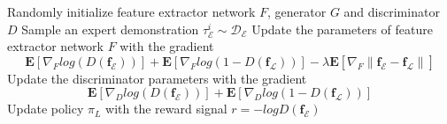 \begin{algorithm}
  \caption{\DAIL{}}
  \label{ch:DAIL:alg:ProposedModel}

  \begin{algorithmic}[1]
    \Input
    \EndInput

    \State Randomly initialize feature extractor network $F$, generator $G$ and discriminator $D$
    \State Sample an expert demonstration $\tau^i_\mathcal{E} \sim \mathcal{D}_\mathcal{E}$
    \State Update the parameters of feature extractor network $F$ with the gradient
    \[\mathbf{E}[
        \nabla_F log(D( \mathbf{f}_\mathcal{E} ))
      ] + \mathbf{E}[
        \nabla_F log(1 - D( \mathbf{f}_\mathcal{L} ))
      ] - \lambda \mathbf{E}[
        \nabla_F \left\|
        \mathbf{f}_\mathcal{E} - \mathbf{f}_\mathcal{L}
        \right\|
      ]
    \]
    \State Update the discriminator parameters with the gradient
    \[\mathbf{E}[
        \nabla_D log(D( \mathbf{f}_\mathcal{E} ))
      ] + \mathbf{E}[
        \nabla_D log(1 - D( \mathbf{f}_\mathcal{L} ))
      ]\]
    \State Update policy $\pi_{L}$ with the reward signal $r=-logD(\mathbf{f}_\mathcal{E})$
    \EndFor

    \Output
    \EndOutput
  \end{algorithmic}
\end{algorithm}
